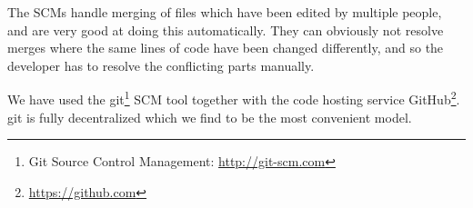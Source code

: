The SCMs handle merging of files which have been edited by multiple people, and
are very good at doing this automatically. They can obviously not resolve merges
where the same lines of code have been changed differently, and so the developer
has to resolve the conflicting parts manually.

We have used the git\footnote{Git Source Control Management:
  \url{http://git-scm.com}} SCM tool together with the code hosting service
GitHub\footnote{\url{https://github.com}}. git is fully decentralized which we
find to be the most convenient model.

